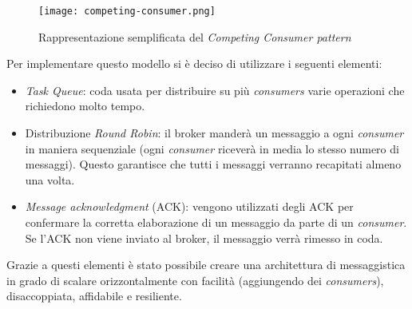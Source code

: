 \begin{figure}[h!]
    \centering
    \texttt{[image: competing-consumer.png]}
    \caption{Rappresentazione semplificata del \textit{Competing Consumer pattern}}
    \label{fig:CompetingConsumers}
\end{figure}

Per implementare questo modello si è deciso di utilizzare i seguenti elementi:
\begin{itemize}
    \itemsep0em
    \item \textit{Task Queue}: coda usata per distribuire su più \textit{consumers} varie operazioni che richiedono molto tempo.
    \item Distribuzione \textit{Round Robin}: il broker manderà un messaggio a ogni \textit{consumer} in maniera sequenziale (ogni \textit{consumer} riceverà in media lo stesso numero di messaggi). Questo garantisce che tutti i messaggi verranno recapitati almeno una volta.
    \item \textit{Message acknowledgment} (ACK): vengono utilizzati degli ACK per confermare la corretta elaborazione di un messaggio da parte di un \textit{consumer}. Se l'ACK non viene inviato al broker, il messaggio verrà rimesso in coda.
\end{itemize}
Grazie a questi elementi è stato possibile creare una architettura di messaggistica in grado di scalare orizzontalmente con facilità (aggiungendo dei \textit{consumers}), disaccoppiata, affidabile e resiliente.



